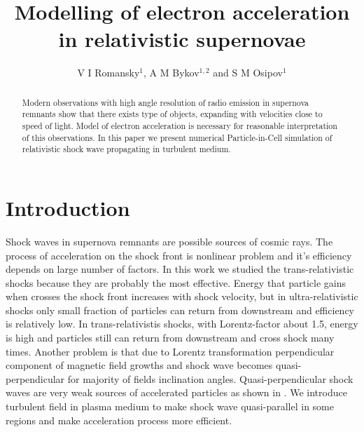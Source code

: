 \documentclass[a4paper]{jpconf}
\begin{document}
\title{Modelling of electron acceleration in relativistic supernovae}

\author{V I Romansky$^{1}$, A M Bykov$^{1,2}$ and S M Osipov$^1$}

\address{$^1$ Ioffe Institute, 26 Politekhnicheskaya st., St. Petersburg 194021, Russia}
\address{$^2$ Peter the Great St.~Petersburg Polytechnic University, 29 Politekhnicheskaya st., St. Petersburg 195251, Russia}


\begin{abstract}
	Modern observations with high angle resolution of radio emission in supernova remnants show that there exists type of objects, expanding with velocities close to speed of light. Model of electron acceleration is necessary for reasonable interpretation of this observations. In this paper we present numerical Particle-in-Cell simulation of relativistic shock wave propagating in turbulent medium.
\end{abstract}
\section{Introduction}
Shock waves in supernova remnants are possible sources of cosmic rays. The process of acceleration on the shock front is nonlinear problem and it's efficiency depends on large number of factors. In this work we studied the trans-relativistic shocks because they are probably the most effective. Energy that particle gains when crosses the shock front increases with shock velocity, but in ultra-relativistic shocks only small fraction of particles can return from downstream and efficiency is relatively low. In trans-relativistis shocks, with Lorentz-factor about 1.5, energy is high and particles still can return from downstream and cross shock many times. Another problem is that due to Lorentz transformation perpendicular component of magnetic field growths and shock wave becomes quasi-perpendicular for majority of fields inclination angles. Quasi-perpendicular shock waves are very weak sources of accelerated particles as shown in . We introduce turbulent field in plasma medium to make shock wave quasi-parallel in some regions and make acceleration process more efficient.
\end{document}

